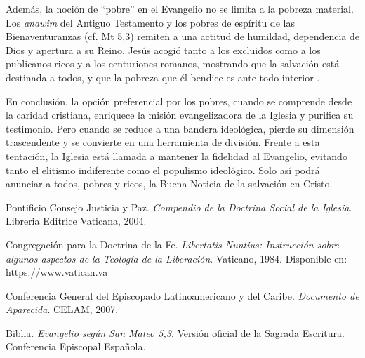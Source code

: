 \documentclass[12pt]{article}
\begin{document}
Además, la noción de “pobre” en el Evangelio no se limita a la pobreza material. Los \textit{anawim} del Antiguo Testamento y los pobres de espíritu de las Bienaventuranzas (cf. Mt 5,3) remiten a una actitud de humildad, dependencia de Dios y apertura a su Reino. Jesús acogió tanto a los excluidos como a los publicanos ricos y a los centuriones romanos, mostrando que la salvación está destinada a todos, y que la pobreza que él bendice es ante todo interior \cite{evangelio}.

En conclusión, la opción preferencial por los pobres, cuando se comprende desde la caridad cristiana, enriquece la misión evangelizadora de la Iglesia y purifica su testimonio. Pero cuando se reduce a una bandera ideológica, pierde su dimensión trascendente y se convierte en una herramienta de división. Frente a esta tentación, la Iglesia está llamada a mantener la fidelidad al Evangelio, evitando tanto el elitismo indiferente como el populismo ideológico. Solo así podrá anunciar a todos, pobres y ricos, la Buena Noticia de la salvación en Cristo.

\begin{thebibliography}{9}

Pontificio Consejo Justicia y Paz. 
\textit{Compendio de la Doctrina Social de la Iglesia}. 
Libreria Editrice Vaticana, 2004.

Congregación para la Doctrina de la Fe. 
\textit{Libertatis Nuntius: Instrucción sobre algunos aspectos de la Teología de la Liberación}. 
Vaticano, 1984. Disponible en: \url{https://www.vatican.va}

Conferencia General del Episcopado Latinoamericano y del Caribe. 
\textit{Documento de Aparecida}. 
CELAM, 2007.

Biblia. 
\textit{Evangelio según San Mateo 5,3}. 
Versión oficial de la Sagrada Escritura. Conferencia Episcopal Española.

\end{thebibliography}
\end{document}
